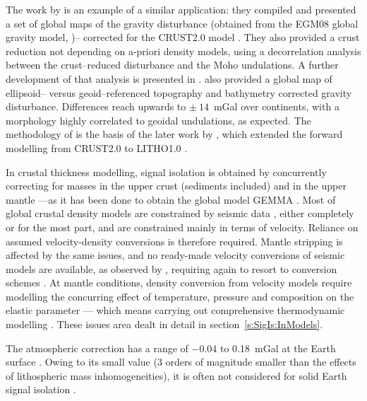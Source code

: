 The work by \textcite{Tenzer2009} is an example of a similar application: they compiled and presented a set of global maps of the gravity disturbance (obtained from the EGM08 global gravity model, \cite{Pavlis2012EGM2008})-- corrected for the {CRUST2.0} model \parencite{Bassin2000Crust20}.
They also provided a crust reduction not depending on a-priori density models, using a decorrelation analysis between the crust--reduced disturbance and the Moho undulations.
A further development of that analysis is presented in \textcite{Tenzer2012contrast}.
\Textcite{Tenzer2009} also provided a global map of ellipsoid-- versus geoid--referenced topography and bathymetry corrected gravity disturbance.
Differences reach upwards to $\pm~14$~\si{\milli Gal} over continents, with a morphology highly correlated to geoidal undulations, as expected.
The methodology of \textcite{Tenzer2009} is the basis of the later work by \textcite{Tenzer2019}, which extended the forward modelling from {CRUST2.0} to {LITHO1.0} \parencite{Pasyanos2014}.

In crustal thickness modelling, signal isolation is obtained by concurrently correcting for masses in the upper crust (sediments included) and in the upper mantle ---as it has been done to obtain the global model {GEMMA} \parencites{Reguzzoni2013}{Reguzzoni2015}.
Most of global crustal density models are constrained by seismic data \parencites[e.g.][]{Laske2012Crust10}{Pasyanos2014}{Szwillus2019}, either completely or for the most part, and are constrained mainly in terms of velocity.
Reliance on assumed velocity-density conversions is therefore required.
Mantle stripping is affected by the same issues, and no ready-made velocity conversions of seismic models are available, as observed by \textcite{Tenzer2015}, requiring again to resort to conversion schemes \parencite[e.g.][]{Sebera2018}.
At mantle conditions, density conversion from velocity models \parencites[e.g.][]{Simmons2010}{Schaeffer2013} require modelling the concurring effect of temperature, pressure and composition on the elastic parameter --- which means carrying out comprehensive thermodynamic modelling \parencites{Connolly2005}{Connolly2009}.
These issues area dealt in detail in section~\ref{s:SigIs:InModels}.

The atmospheric correction has a range of \num{-0.04} to \SI{0.18}{\milli Gal} at the Earth surface \parencite{Tenzer2009_AtmCorr}.
Owing to its small value (3 orders of magnitude smaller than the effects of lithospheric mass inhomogeneities), it is often not considered for solid Earth signal isolation \parencite[e.g][]{Tenzer2019}.

